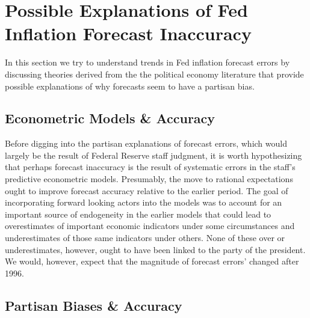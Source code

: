 \documentclass[a4paper]{article}\usepackage{graphicx, color}
\begin{document}
\section{Possible Explanations of Fed Inflation Forecast Inaccuracy}

In this section we try to understand trends in Fed inflation forecast errors by discussing theories derived from the the political economy literature that provide possible explanations of why forecasts seem to have a partisan bias. 

\subsection{Econometric Models \& Accuracy}

Before digging into the partisan explanations of forecast errors, which would largely be the result of Federal Reserve staff judgment, it is worth hypothesizing that perhaps forecast inaccuracy is the result of systematic errors in the staff's predictive econometric models. Presumably, the move to rational expectations ought to improve forecast accuracy relative to the earlier period. The goal of incorporating forward looking actors into the models was to account for an important source of endogeneity in the earlier models that could lead to overestimates of important economic indicators under some circumstances and underestimates of those same indicators under others. None of these over or underestimates, however, ought to have been linked to the party of the president. We would, however, expect that the magnitude of forecast errors' changed after 1996.



\subsection{Partisan Biases \& Accuracy}
\end{document}
